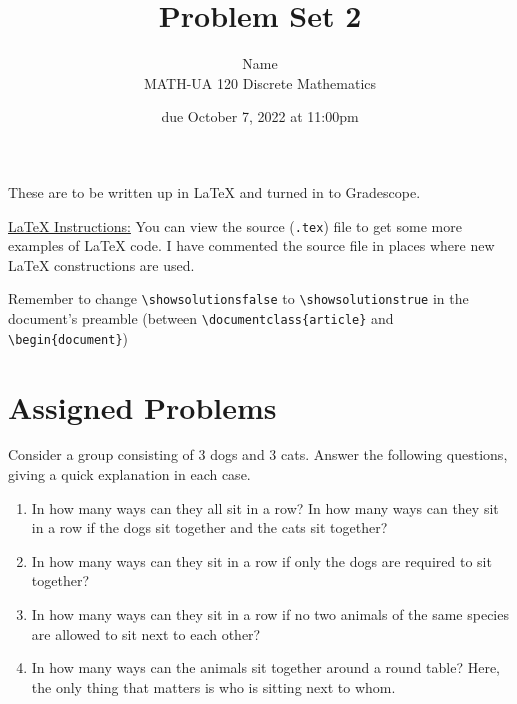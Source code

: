 \documentclass{article}
\title{Problem Set 2}
\author{%
    Name
\\  MATH-UA 120 Discrete Mathematics
}
\date{due October 7, 2022 at 11:00pm}
\newif\ifshowsolutions
\newcommand{\danger}{\marginpar[\hfill\dbend]{\dbend\hfill}}
\theoremstyle{definition}
\begin{document}
\maketitle



These are to be written up in \LaTeX{} and turned in to Gradescope.



\ifshowsolutions
    \SetupExSheets{solution/print=true}
\else
    \danger
 \underline{ \LaTeX{}  Instructions:}  You can view the source (\texttt{.tex}) file to get some more examples of \LaTeX{} code.  I have commented the source file in places where new \LaTeX{} constructions are used.
  
  Remember to change \verb|\showsolutionsfalse| to \verb|\showsolutionstrue|
    in the document's preamble 
    (between \verb|\documentclass{article}| and \verb|\begin{document}|)
\fi

\section*{Assigned Problems}

\begin{question}
Consider a group consisting of 3 dogs and 3 cats. Answer the following questions, giving a quick explanation in each case.

\begin{enumerate}
	\item In how many ways can they all sit in a row? In how many ways can they sit in a row if the dogs sit together and the cats sit together?
	\item In how many ways can they sit in a row if only the dogs are required to sit together?
	\item In how many ways can they sit in a row if no two animals of the same species are allowed to sit next to each other?
	\item In how many ways can the animals sit together around a round table? Here, the only thing that matters is who is sitting next to whom.
\end{enumerate}
\end{question}
\begin{solution}
\end{solution}
\end{document}
